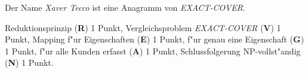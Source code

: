 \begin{diskussion}
Der Name \textsl{Xaver Tecco} ist eine Anagramm von \textsl{EXACT-COVER}.
\end{diskussion}

\begin{bewertung}
Reduktionsprinzip ({\bf R}) 1 Punkt,
Vergleichsproblem \textsl{EXACT-COVER} ({\bf V}) 1 Punkt,
Mapping f"ur Eigenschaften ({\bf E}) 1 Punkt,
f"ur genau eine Eigenschaft ({\bf G}) 1 Punkt,
f"ur alle Kunden erfasst ({\bf A}) 1 Punkt,
Schlussfolgerung NP-vollst"andig ({\bf N}) 1 Punkt.
\end{bewertung}


